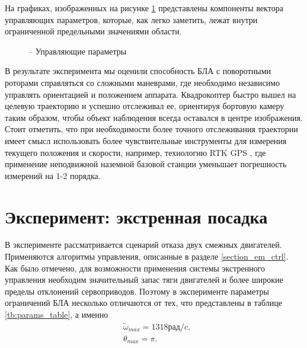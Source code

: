 На графиках, изображенных на рисунке \ref{fig:mau_ctrl_out} представлены компоненты вектора управляющих параметров, которые, как легко заметить, лежат внутри ограниченной предельными значениями области.

\begin{figure}[H]
	\centering
	
	\caption{ -- Управляющие параметры}
	\label{fig:mau_ctrl_out}
	
\end{figure}


В результате эксперимента мы оценили способность БЛА с поворотными роторами справляться со сложными маневрами, где необходимо независимо управлять ориентацией и положением аппарата. Квадрокоптер быстро вышел на целевую траекторию и успешно отслеживал ее, ориентируя бортовую камеру таким образом, чтобы объект наблюдения всегда оставался в центре изображения.
Стоит отметить, что при необходимости более точного отслеживания траектории имеет смысл использовать более чувствительные инструменты для измерения текущего положения и скорости, например, технологию RTK GPS \cite{Feng01}, где применение неподвижной наземной базовой станции уменьшает погрешность измерений на 1-2 порядка.


\section{Эксперимент: экстренная посадка}

В эксперименте рассматривается сценарий отказа двух смежных двигателей. Применяются алгоритмы управления, описанные в разделе \ref{section_em_ctrl}. Как было отмечено, для возможности применения системы экстренного управления необходим значительный запас тяги двигателей и более широкие пределы отклонений сервоприводов. Поэтому в эксперименте параметры ограничений БЛА несколько отличаются от тех, что представлены в таблице \ref{tb:params_table}, а именно
\begin{equation}
\begin{aligned}
&\tilde{\omega}_{max} = 1318 рад/c,
\\
&\theta_{max} = \pi.
\end{aligned}
\end{equation}

